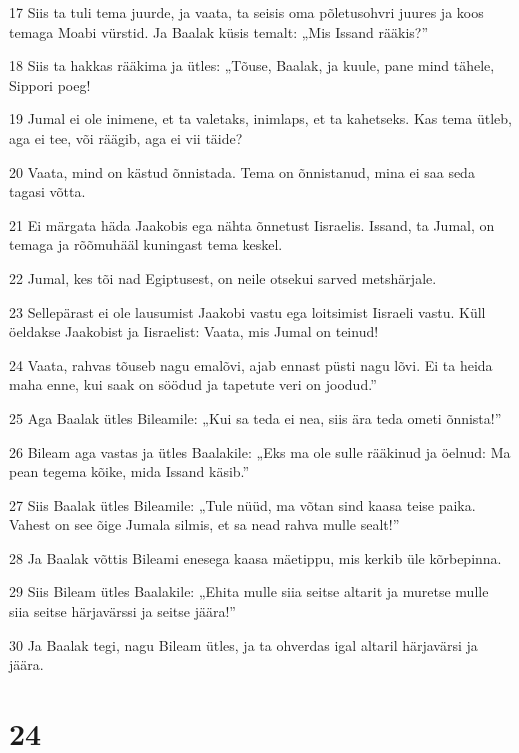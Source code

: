 \par 17 Siis ta tuli tema juurde, ja vaata, ta seisis oma põletusohvri juures ja koos temaga Moabi vürstid. Ja Baalak küsis temalt: „Mis Issand rääkis?”
\par 18 Siis ta hakkas rääkima ja ütles: „Tõuse, Baalak, ja kuule, pane mind tähele, Sippori poeg!
\par 19 Jumal ei ole inimene, et ta valetaks, inimlaps, et ta kahetseks. Kas tema ütleb, aga ei tee, või räägib, aga ei vii täide?
\par 20 Vaata, mind on kästud õnnistada. Tema on õnnistanud, mina ei saa seda tagasi võtta.
\par 21 Ei märgata häda Jaakobis ega nähta õnnetust Iisraelis. Issand, ta Jumal, on temaga ja rõõmuhääl kuningast tema keskel.
\par 22 Jumal, kes tõi nad Egiptusest, on neile otsekui sarved metshärjale.
\par 23 Sellepärast ei ole lausumist Jaakobi vastu ega loitsimist Iisraeli vastu. Küll öeldakse Jaakobist ja Iisraelist: Vaata, mis Jumal on teinud!
\par 24 Vaata, rahvas tõuseb nagu emalõvi, ajab ennast püsti nagu lõvi. Ei ta heida maha enne, kui saak on söödud ja tapetute veri on joodud.”
\par 25 Aga Baalak ütles Bileamile: „Kui sa teda ei nea, siis ära teda ometi õnnista!”
\par 26 Bileam aga vastas ja ütles Baalakile: „Eks ma ole sulle rääkinud ja öelnud: Ma pean tegema kõike, mida Issand käsib.”
\par 27 Siis Baalak ütles Bileamile: „Tule nüüd, ma võtan sind kaasa teise paika. Vahest on see õige Jumala silmis, et sa nead rahva mulle sealt!”
\par 28 Ja Baalak võttis Bileami enesega kaasa mäetippu, mis kerkib üle kõrbepinna.
\par 29 Siis Bileam ütles Baalakile: „Ehita mulle siia seitse altarit ja muretse mulle siia seitse härjavärssi ja seitse jäära!”
\par 30 Ja Baalak tegi, nagu Bileam ütles, ja ta ohverdas igal altaril härjavärsi ja jäära.

\chapter{24}

